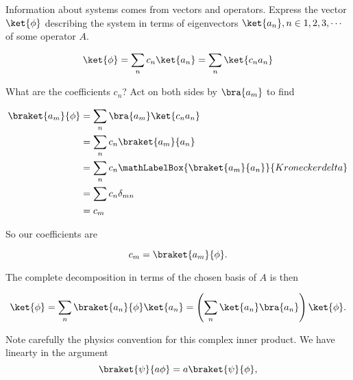 %
%
%

Information about systems comes from vectors and operators.  Express the vector \(\ket{\phi}\) describing the system in terms of eigenvectors \(\ket{a_n}, n \in 1,2,3,\cdots\) of some operator \(A\).

\begin{equation}\label{eqn:PHY356FLecture10:51}
\ket{\phi} = \sum_n c_n \ket{a_n} = \sum_n \ket{c_n a_n}
\end{equation}

What are the coefficients \(c_n\)?  Act on both sides by \(\bra{a_m}\) to find

\begin{equation}\label{eqn:lecture5BigReviewCh1Formalism:71}
\begin{aligned}
\braket{a_m}{\phi}
&= \sum_n \bra{a_m} \ket{ c_n a_n } \\
&= \sum_n c_n \braket{a_m}{ a_n } \\
&= \sum_n c_n 
\mathLabelBox{\braket{a_m}{a_n}}{Kronecker delta}
\\
&= \sum c_n \delta_{mn} \\
&= c_m
\end{aligned}
\end{equation}

So our coefficients are

\begin{equation}\label{eqn:PHY356FLecture10:51c}
c_m = \braket{a_m}{\phi}.
\end{equation}

The complete decomposition in terms of the chosen basis of \(A\) is then

\begin{equation}\label{eqn:PHY356FLecture10:51b}
\ket{\phi} = \sum_n \braket{a_n}{\phi} \ket{a_n}
= \left( \sum_n \ket{a_n} \bra{a_n} \right) \ket{\phi}.
\end{equation}

Note carefully the physics convention for this complex inner product.  We have linearty in the  argument
\begin{equation}\label{eqn:PHY356FLecture10:51e}
\braket{\psi}{a \phi} = a \braket{\psi}{\phi},
\end{equation}

